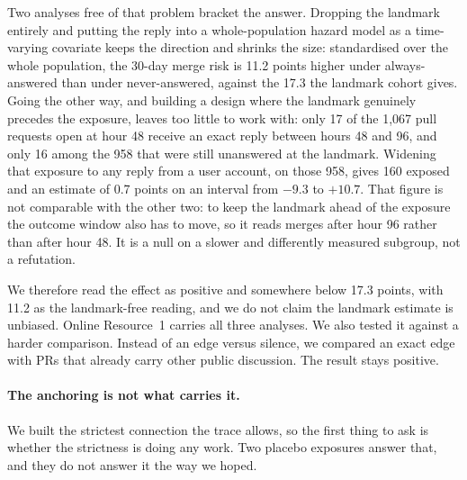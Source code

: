 \documentclass[lineno,pdflatex,sn-basic]{sn-jnl}
\begin{document}
Two analyses free of that problem bracket the answer. Dropping the landmark
entirely and putting the reply into a whole-population hazard model as a
time-varying covariate keeps the direction and shrinks the size: standardised
over the whole population, the 30-day merge risk is 11.2 points higher under
always-answered than under never-answered, against the 17.3 the landmark
cohort gives. Going the other way, and building a design where the landmark
genuinely precedes the exposure, leaves too little to work with: only 17 of the
1,067 pull requests open at hour 48 receive an exact reply between hours 48 and
96, and only 16 among the 958 that were still unanswered at the landmark.
Widening that exposure to any reply from a user account, on those 958, gives 160
exposed and an estimate of 0.7 points on an interval from $-9.3$ to $+10.7$. That
figure is not comparable with the other two: to keep the landmark ahead of the
exposure the outcome window also has to move, so it reads merges after hour 96
rather than after hour 48. It is a null on a slower and differently measured
subgroup, not a refutation.

We therefore read the effect as positive and somewhere below 17.3 points, with
11.2 as the landmark-free reading, and we do not claim the landmark estimate is
unbiased. Online Resource~1 carries all three analyses. We also tested it against a harder comparison. Instead of an edge
versus silence, we compared an exact edge with PRs that already carry other
public discussion. The result stays positive.

\paragraph{The anchoring is not what carries it.} We built the strictest
connection the trace allows, so the first thing to ask is whether the strictness
is doing any work. Two placebo exposures answer that, and they do not answer it
the way we hoped.
\end{document}
